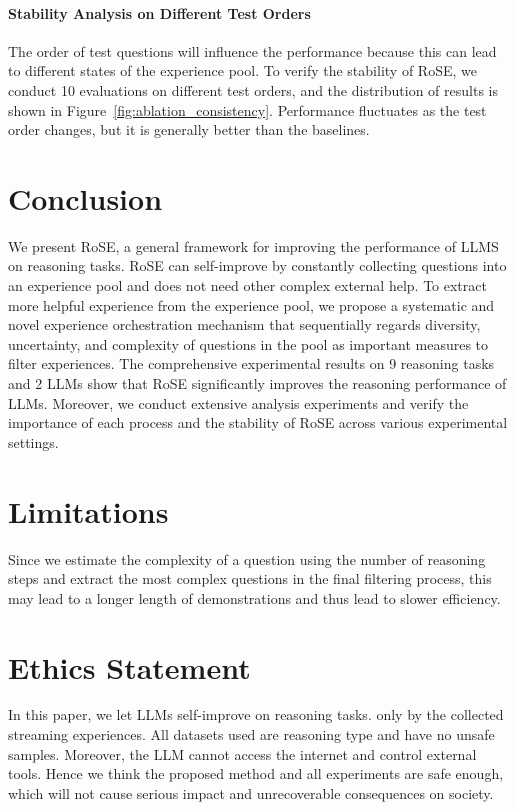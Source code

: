 \documentclass[11pt]{article}
\begin{document}
\paragraph{Stability Analysis on Different Test Orders} The order of test questions will influence the performance because this can lead to different states of the experience pool. To verify the stability of RoSE, we conduct 10 evaluations on different test orders, and the distribution of results is shown in Figure~\ref{fig:ablation_consistency}. Performance fluctuates as the test order changes, but it is generally better than the baselines.


\section{Conclusion}
We present RoSE, a general framework for improving the performance of LLMS on reasoning tasks. RoSE can self-improve by constantly collecting questions into an experience pool and does not need other complex external help. To extract more helpful experience from the experience pool, we propose a systematic and novel experience orchestration mechanism that sequentially regards diversity, uncertainty, and complexity of questions in the pool as important measures to filter experiences. The comprehensive experimental results on 9 reasoning tasks and 2 LLMs show that RoSE significantly improves the reasoning performance of LLMs. Moreover, we conduct extensive analysis experiments and verify the importance of each process and the stability of RoSE across various experimental settings.

\section*{Limitations}
Since we estimate the complexity of a question using the number of reasoning steps and extract the most complex questions in the final filtering process, this may lead to a longer length of demonstrations and thus lead to slower efficiency.

\section*{Ethics Statement}
In this paper, we let LLMs self-improve on reasoning tasks. only by the collected streaming experiences. All datasets used are reasoning type and have no unsafe samples. Moreover, the LLM cannot access the internet and control external tools. Hence we think the proposed method and all experiments are safe enough, which will not cause serious impact and unrecoverable consequences on society.
\end{document}
